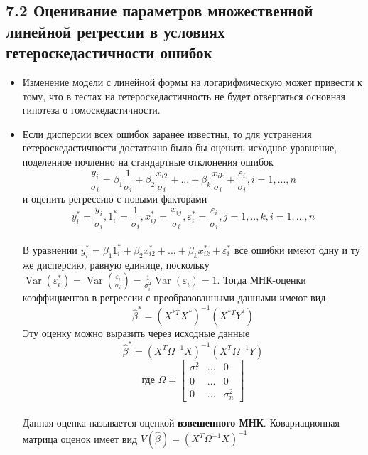 \documentclass[a0,final]{a0poster}
\DeclareMathOperator{\Var}{Var}
\begin{document}
\begin{multicols}{4}
\begin{itemize}
\end{itemize}

\subsection*{7.2 Оценивание параметров множественной линейной регрессии в условиях гетероскедастичности ошибок}
\begin{itemize}
\item Изменение модели с линейной формы на логарифмическую может привести к тому, что в тестах на гетероскедастичность не будет отвергаться основная гипотеза о гомоскедастичности.
\item Если дисперсии всех ошибок заранее известны, то для устранения гетероскедастичности достаточно было бы оценить исходное уравнение, поделенное почленно на стандартные отклонения ошибок\\
$$\frac{y_i}{\sigma_i} = \beta_1\frac{1}{\sigma_i} + \beta_2\frac{x_{i2}}{\sigma_i} + ... + \beta_k\frac{x_{ik}}{\sigma_i} + \frac{\varepsilon_i}{\sigma_i},  i = 1, ..., n$$ и оценить регрессию с новыми факторами \\
$$y^*_i = \frac{y_i}{\sigma_i}, 1_i^* = \frac{1}{\sigma_i}, x_{ij}^* = \frac{x_{ij}}{\sigma_i}, \varepsilon_i^* = \frac{\varepsilon_i}{\sigma_i}, j = 1, .., k, i = 1, ..., n$$ \\
В уравнении $y_i^* = \beta_1 1_i^* + \beta_2 x_{i2}^* + ... + \beta_k x_{ik}^* + \varepsilon_i^*$ все ошибки имеют одну и ту же дисперсию, равную единице, поскольку $\Var(\varepsilon^*_i) = \Var(\frac{\varepsilon_i}{\sigma_i}) = \frac{1}{\sigma_i^2}\Var(\varepsilon_i) = 1$.
Тогда МНК-оценки коэффициентов в регрессии с преобразованными данными имеют вид $$\hat{\beta}^* = (X^{*T}X^*)^{-1}(X^{*T}Y^*)$$
Эту оценку можно выразить через исходные данные $$\hat{\beta}^* = (X^T\Omega^{-1}X)^{-1}(X^T\Omega^{-1}Y)$$ $$\text{где } \Omega =
\begin{bmatrix}
    \sigma_1^2 & \dots & 0 \\
    0          & \dots & 0 \\
    0          & \dots & \sigma^2_n
\end{bmatrix}$$ \\
Данная оценка называется оценкой \textbf{взвешенного МНК}. Ковариационная матрица оценок имеет вид $V(\hat{\beta}) = (X^T\Omega^{-1}X)^{-1}$


\end{itemize}
\end{multicols}
\end{document}
